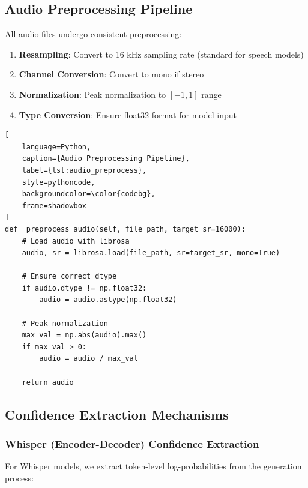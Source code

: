 \subsection{Audio Preprocessing Pipeline}

All audio files undergo consistent preprocessing:

\begin{enumerate}
    \item \textbf{Resampling}: Convert to 16 kHz sampling rate (standard for speech models)
    \item \textbf{Channel Conversion}: Convert to mono if stereo
    \item \textbf{Normalization}: Peak normalization to $[-1, 1]$ range
    \item \textbf{Type Conversion}: Ensure float32 format for model input
\end{enumerate}

\begin{lstlisting}[
    language=Python,
    caption={Audio Preprocessing Pipeline},
    label={lst:audio_preprocess},
    style=pythoncode,
    backgroundcolor=\color{codebg},
    frame=shadowbox
]
def _preprocess_audio(self, file_path, target_sr=16000):
    # Load audio with librosa
    audio, sr = librosa.load(file_path, sr=target_sr, mono=True)
    
    # Ensure correct dtype
    if audio.dtype != np.float32:
        audio = audio.astype(np.float32)
    
    # Peak normalization
    max_val = np.abs(audio).max()
    if max_val > 0:
        audio = audio / max_val
    
    return audio
\end{lstlisting}

\subsection{Confidence Extraction Mechanisms}

\subsubsection{Whisper (Encoder-Decoder) Confidence Extraction}

For Whisper models, we extract token-level log-probabilities from the generation process:

